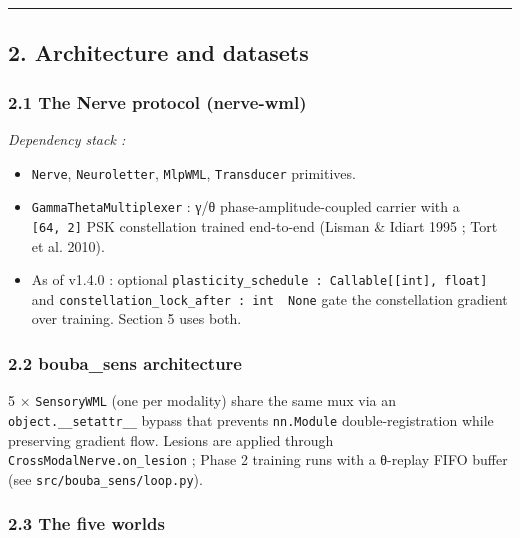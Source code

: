 \documentclass[
]{article}
\providecommand{\tightlist}{%
  \setlength{\itemsep}{0pt}\setlength{\parskip}{0pt}}
\begin{document}
\begin{center}\rule{0.5\linewidth}{0.5pt}\end{center}

\subsection{2. Architecture and
datasets}\label{2-architecture-and-datasets}

\subsubsection{2.1 The Nerve protocol
(nerve-wml)}\label{21-the-nerve-protocol-nerve-wml}

\emph{Dependency stack :}

\begin{itemize}
\tightlist
\item
  \texttt{Nerve}, \texttt{Neuroletter}, \texttt{MlpWML},
  \texttt{Transducer} primitives.
\item
  \texttt{GammaThetaMultiplexer} : γ/θ phase-amplitude-coupled carrier
  with a \texttt{{[}64,\ 2{]}} PSK constellation trained end-to-end
  (Lisman \& Idiart 1995 ; Tort et al. 2010).
\item
  As of v1.4.0 : optional
  \texttt{plasticity\_schedule\ :\ Callable{[}{[}int{]},\ float{]}} and
  \texttt{constellation\_lock\_after\ :\ int\ \textbar{}\ None} gate the
  constellation gradient over training. Section 5 uses both.
\end{itemize}

\subsubsection{2.2 bouba\_sens
architecture}\label{22-bouba_sens-architecture}

5 × \texttt{SensoryWML} (one per modality) share the same mux via an
\texttt{object.\_\_setattr\_\_} bypass that prevents \texttt{nn.Module}
double-registration while preserving gradient flow. Lesions are applied
through \texttt{CrossModalNerve.on\_lesion} ; Phase 2 training runs with
a θ-replay FIFO buffer (see \texttt{src/bouba\_sens/loop.py}).

\subsubsection{2.3 The five worlds}\label{23-the-five-worlds}
\end{document}
